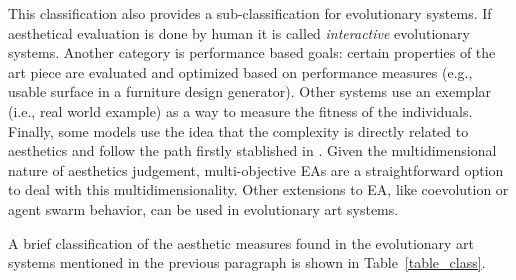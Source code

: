 This classification also provides a sub-classification for
evolutionary systems. If aesthetical evaluation is done by human it is
called {\em interactive} evolutionary systems. Another category is
performance %
 based goals: certain properties of the art piece are evaluated and
 optimized based on performance measures (e.g., usable surface in a
 furniture design generator). Other systems use an exemplar (i.e.,
 real world example) as a way to measure the fitness of the
 individuals. %
 Finally, some models use the idea that the complexity is directly
 related to aesthetics and follow the path firstly stablished in
 \cite{birkhoff2003aesthetic}.  Given the multidimensional nature of
 aesthetics judgement, multi-objective EAs are a straightforward
 option to deal with this multidimensionality. %
 Other extensions to EA, like coevolution or agent swarm behavior, can
 be used in evolutionary art systems. %

A brief classification of the aesthetic measures found in the
evolutionary art systems mentioned in the previous paragraph %
 is shown in Table~\ref{table_class}.



